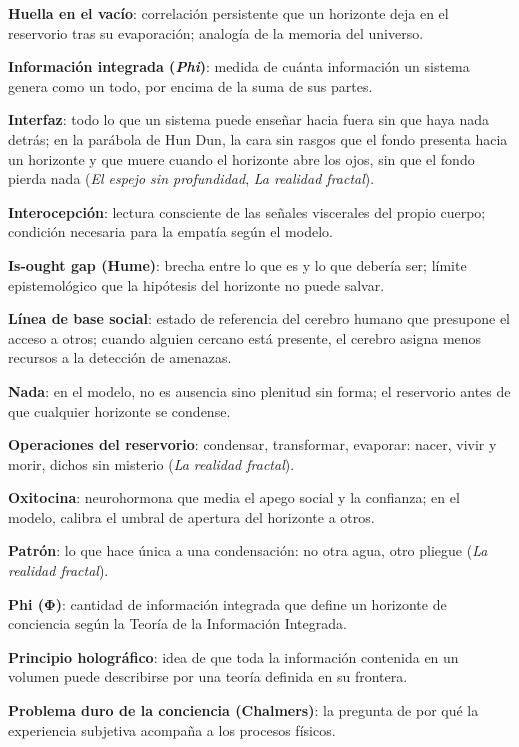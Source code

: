 \glos \textbf{Huella en el vacío}: correlación persistente que un horizonte deja en el reservorio tras su evaporación; analogía de la memoria del universo.

\glos \textbf{Información integrada (\emph{Phi})}: medida de cuánta información un sistema genera como un todo, por encima de la suma de sus partes.

\glos \textbf{Interfaz}: todo lo que un sistema puede enseñar hacia fuera sin que haya nada detrás; en la parábola de Hun Dun, la cara sin rasgos que el fondo presenta hacia un horizonte y que muere cuando el horizonte abre los ojos, sin que el fondo pierda nada (\emph{El espejo sin profundidad}, \emph{La realidad fractal}).

\glos \textbf{Interocepción}: lectura consciente de las señales viscerales del propio cuerpo; condición necesaria para la empatía según el modelo.

\glos \textbf{Is-ought gap (Hume)}: brecha entre lo que es y lo que debería ser; límite epistemológico que la hipótesis del horizonte no puede salvar.

\glos \textbf{Línea de base social}: estado de referencia del cerebro humano que presupone el acceso a otros; cuando alguien cercano está presente, el cerebro asigna menos recursos a la detección de amenazas.

\glos \textbf{Nada}: en el modelo, no es ausencia sino plenitud sin forma; el reservorio antes de que cualquier horizonte se condense.

\glos \textbf{Operaciones del reservorio}: condensar, transformar, evaporar: nacer, vivir y morir, dichos sin misterio (\emph{La realidad fractal}).

\glos \textbf{Oxitocina}: neurohormona que media el apego social y la confianza; en el modelo, calibra el umbral de apertura del horizonte a otros.

\glos \textbf{Patrón}: lo que hace única a una condensación: no otra agua, otro pliegue (\emph{La realidad fractal}).

\glos \textbf{Phi (Φ)}: cantidad de información integrada que define un horizonte de conciencia según la Teoría de la Información Integrada.

\glos \textbf{Principio holográfico}: idea de que toda la información contenida en un volumen puede describirse por una teoría definida en su frontera.

\glos \textbf{Problema duro de la conciencia (Chalmers)}: la pregunta de por qué la experiencia subjetiva acompaña a los procesos físicos.

